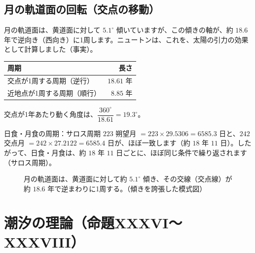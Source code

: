 \documentclass[a4paper,11pt,openany]{ltjsbook}
\begin{document}
\subsection{月の軌道面の回転（交点の移動）}

月の軌道面は、黄道面に対して $5.1^\circ$ 傾いていますが、この傾きの軸が、約 $18.6$ 年で逆向き（西向き）に1周します。ニュートンは、これを、太陽の引力の効果として計算しました（事実）。

\begin{center}
\begin{tabular}{lr}
\toprule
周期 & 長さ\\
\midrule
交点が1周する周期（逆行） & $18.61$ 年\\
近地点が1周する周期（順行） & $8.85$ 年\\
\bottomrule
\end{tabular}
\end{center}

交点が1年あたり動く角度は、$\dfrac{360^\circ}{18.61}=19.3^\circ$。

\begin{examplebox}{日食・月食の周期：サロス周期}
$223$ 朔望月 $=223\times29.5306=6585.3$ 日と、$242$ 交点月 $=242\times27.2122=6585.4$ 日が、ほぼ一致します（約 $18$ 年 $11$ 日）。したがって、日食・月食は、約 $18$ 年 $11$ 日ごとに、ほぼ同じ条件で繰り返されます（サロス周期）。
\end{examplebox}

\begin{figure}[htbp]
\centering
{}
\caption{月の軌道面は、黄道面に対して約 $5.1^\circ$ 傾き、その交線（交点線）が約 $18.6$ 年で逆まわりに1周する。（傾きを誇張した模式図）}
\end{figure}

\section{潮汐の理論（命題XXXVI〜XXXVIII）}
\end{document}
